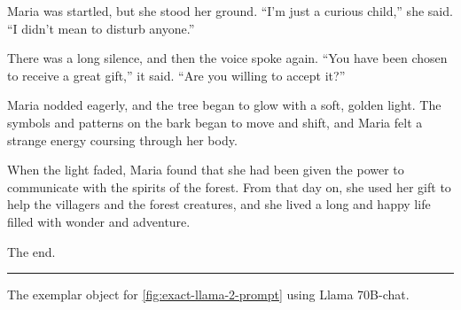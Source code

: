 \documentclass[a4paper]{article}
\begin{document}
\begin{story}[!h]
\hspace{10pt} Maria was startled, but she stood her ground. ``I'm just a curious child,'' she said. ``I didn't mean to disturb anyone.''
\vspace{1ex}

\hspace{10pt} There was a long silence, and then the voice spoke again. ``You have been chosen to receive a great gift,'' it said. ``Are you willing to accept it?''
\vspace{1ex}

\hspace{10pt} Maria nodded eagerly, and the tree began to glow with a soft, golden light. The symbols and patterns on the bark began to move and shift, and Maria felt a strange energy coursing through her body.
\vspace{1ex}

\hspace{10pt} When the light faded, Maria found that she had been given the power to communicate with the spirits of the forest. From that day on, she used her gift to help the villagers and the forest creatures, and she lived a long and happy life filled with wonder and adventure.
\vspace{1ex}

\hspace{10pt} The end.
\vspace{1ex}
\hrule
\vspace{1ex}
\rmfamily
\caption{The exemplar object for \autoref{fig:exact-llama-2-prompt} using Llama 70B-chat.}\label{narrative:the-prototype-story}
\end{story}
\end{document}
